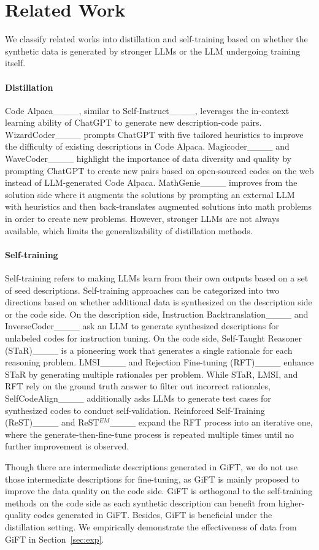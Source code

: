 \section{Related Work}
We classify related works into distillation and self-training based on whether the synthetic data is generated by stronger LLMs or the LLM undergoing training itself.
\paragraph{Distillation}
Code Alpaca____, similar to Self-Instruct____, leverages the in-context learning ability of ChatGPT to generate new description-code pairs. WizardCoder____ prompts ChatGPT with five tailored heuristics to improve the difficulty of existing descriptions in Code Alpaca. Magicoder____ and WaveCoder____ highlight the importance of data diversity and quality by prompting ChatGPT to create new pairs based on open-sourced codes on the web instead of LLM-generated Code Alpaca. 
MathGenie____ improves from the solution side where it augments the solutions by prompting an external LLM with heuristics and then back-translates augmented solutions into math problems in order to create new problems. However, stronger LLMs are not always available, which limits the generalizability of distillation methods.

\paragraph{Self-training}
Self-training refers to making LLMs learn from their own outputs based on a set of seed descriptions. Self-training approaches can be categorized into two directions based on whether additional data is synthesized on the description side or the code side. On the description side, Instruction Backtranslation____ and InverseCoder____ ask an LLM to generate synthesized descriptions for unlabeled codes for instruction tuning.
On the code side, Self-Taught Reasoner (STaR)____ is a pioneering work that generates a single rationale for each reasoning problem. LMSI____ and Rejection Fine-tuning (RFT)____ enhance STaR by generating multiple rationales per problem. While STaR, LMSI, and RFT rely on the ground truth answer to filter out incorrect rationales, SelfCodeAlign____ additionally asks LLMs to generate test cases for synthesized codes to conduct self-validation. Reinforced Self-Training (ReST)____ and ReST$^{EM}$____ expand the RFT process into an iterative one, where the generate-then-fine-tune process is repeated multiple times until no further improvement is observed.

Though there are intermediate descriptions generated in GiFT, we do not use those intermediate descriptions for fine-tuning, as GiFT is mainly proposed to improve the data quality on the code side.
GiFT is orthogonal to the self-training methods on the code side as each synthetic description can benefit from higher-quality codes generated in GiFT. Besides, GiFT is beneficial under the distillation setting. We empirically demonstrate the effectiveness of data from GiFT in Section~\ref{sec:exp}.